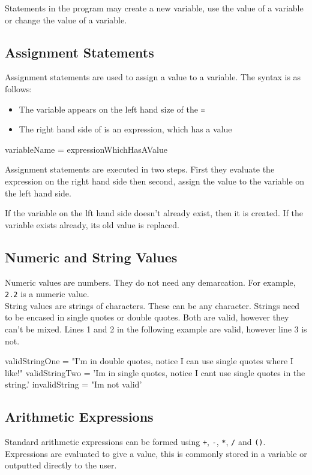Statements in the program may create a new variable, use the value of a variable or change the value of a variable.

\subsection*{Assignment Statements}
Assignment statements are used to assign a value to a variable. The syntax is as follows:
\begin{itemize}
    \item The variable appears on the left hand size of the \verb|=|
    \item The right hand side of is an expression, which has a value
\end{itemize}
\begin{python}
variableName = expressionWhichHasAValue
\end{python}

Assignment statements are executed in two steps. First they evaluate the expression on the right hand side then second, assign the value to the variable on the left hand side.

If the variable on the lft hand side doesn't already exist, then it is created. If the variable exists already, its old value is replaced.

\subsection*{Numeric and String Values}
Numeric values are numbers. They do not need any demarcation. For example, \verb|2.2| is a numeric value.\\
String values are strings of characters. These can be any character. Strings need to be encased in single quotes or double quotes. Both are valid, however they can't be mixed. Lines 1 and 2 in the following example are valid, however line 3 is not.
\begin{python}
validStringOne = "I'm in double quotes, notice I can use single quotes where I like!"
validStringTwo = 'Im in single quotes, notice I cant use single quotes in the string.'
invalidString = "Im not valid'
\end{python}

\subsection*{Arithmetic Expressions}
Standard arithmetic expressions can be formed using \verb|+|, \verb|-|, \verb|*|, \verb|/| and \verb|()|. Expressions are evaluated to give a value, this is commonly stored in a variable or outputted directly to the user.

